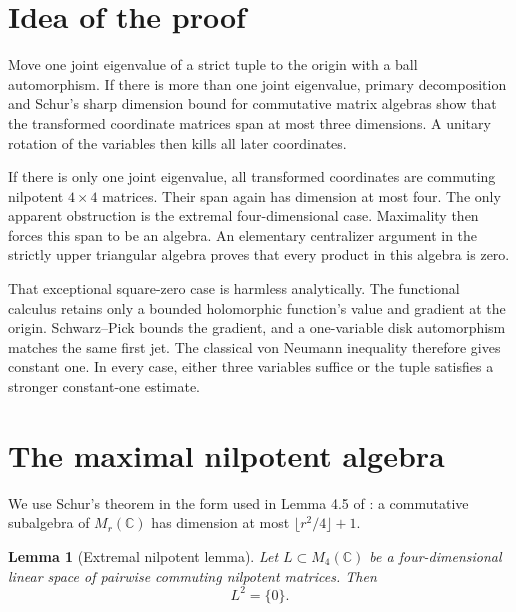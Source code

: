 \documentclass[11pt]{article}
\newtheorem{lemma}[theorem]{Lemma}
\theoremstyle{remark}
\newcommand{\C}{\mathbb C}
\begin{document}
\section{Idea of the proof}

Move one joint eigenvalue of a strict tuple to the origin with a ball
automorphism.  If there is more than one joint eigenvalue, primary
decomposition and Schur's sharp dimension bound for commutative matrix
algebras show that the transformed coordinate matrices span at most three
dimensions.  A unitary rotation of the variables then kills all later
coordinates.

If there is only one joint eigenvalue, all transformed coordinates are
commuting nilpotent $4\times4$ matrices.  Their span again has dimension at
most four.  The only apparent obstruction is the extremal four-dimensional
case.  Maximality then forces this span to be an algebra.  An elementary
centralizer argument in the strictly upper triangular algebra proves that
every product in this algebra is zero.

That exceptional square-zero case is harmless analytically.  The functional
calculus retains only a bounded holomorphic function's value and gradient at
the origin.  Schwarz--Pick bounds the gradient, and a one-variable disk
automorphism matches the same first jet.  The classical von Neumann
inequality therefore gives constant one.  In every case, either three
variables suffice or the tuple satisfies a stronger constant-one estimate.

\section{The maximal nilpotent algebra}

We use Schur's theorem in the form used in Lemma 4.5 of \cite{HRS}: a
commutative subalgebra of $M_r(\C)$ has dimension at most
$\lfloor r^2/4\rfloor+1$.

\begin{lemma}[Extremal nilpotent lemma]\label{lem:nilpotent}
Let $L\subset M_4(\C)$ be a four-dimensional linear space of pairwise
commuting nilpotent matrices.  Then
\[
 L^2=\{0\}.
\]
\end{lemma}
\end{document}
